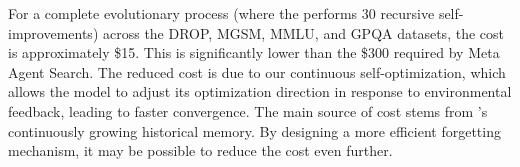 \label{sec:cost}
For a complete evolutionary process (where the \framework performs 30 recursive self-improvements) across the DROP, MGSM, MMLU, and GPQA datasets, the cost is approximately \$15. This is significantly lower than the \$300 required by Meta Agent Search. The reduced cost is due to our continuous self-optimization, which allows the model to adjust its optimization direction in response to environmental feedback, leading to faster convergence.
The main source of cost stems from \framework's continuously growing historical memory. By designing a more efficient forgetting mechanism, it may be possible to reduce the cost even further.